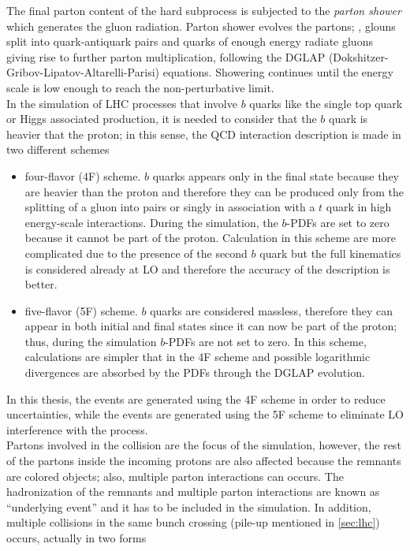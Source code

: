 \noindent The final parton content of the hard subprocess is subjected to the \textit{parton shower} which generates the gluon radiation. Parton shower evolves the partons; \ie, glouns split into quark-antiquark pairs and quarks of enough energy radiate gluons giving rise to further parton multiplication, following the DGLAP (Dokshitzer-Gribov-Lipatov-Altarelli-Parisi) equations. Showering continues until the energy scale is low enough to reach the non-perturbative limit.\\   

\noindent In the simulation of LHC processes that involve $b$ quarks like the single top quark or Higgs associated production, it is needed to consider that the $b$ quark is heavier that the proton; in this sense, the QCD interaction description is made in two different schemes \cite{schemes}

\begin{itemize}

\item four-flavor (4F) scheme. $b$ quarks appears only in the final state because they are heavier than the proton and therefore they can be produced only from the splitting of a gluon into pairs or singly in association with a $t$ quark in high energy-scale interactions. During the simulation, the $b$-PDFs are set to zero because it cannot be part of the proton. Calculation in this scheme are more complicated due to the presence of the second $b$ quark but the full kinematics is considered already at LO and therefore the accuracy of the description is better.   

\item five-flavor (5F) scheme. $b$ quarks are considered massless, therefore they can appear in both initial and final states since it can now be part of the proton; thus, during the simulation $b$-PDFs are not set to zero. In this scheme, calculations are simpler that in the 4F scheme and possible logarithmic divergences are absorbed by the PDFs through the DGLAP evolution.   
\end{itemize}

\noindent In this thesis, the \tHq events are generated using the 4F scheme in order to reduce uncertainties, while the \tHW events are generated using the 5F scheme to eliminate LO interference with the \ttH process\cite{demartin}.\\    

\noindent Partons involved in the \pp collision are the focus of the simulation, however, the rest of the partons inside the incoming protons are also affected because the remnants are colored objects; also, multiple parton interactions can occurs. The hadronization of the remnants and multiple parton interactions are known as ``underlying event'' and it has to be included in the simulation. In addition, multiple \pp collisions in the same bunch crossing (pile-up mentioned in \ref{sec:lhc}) occurs, actually in two forms

